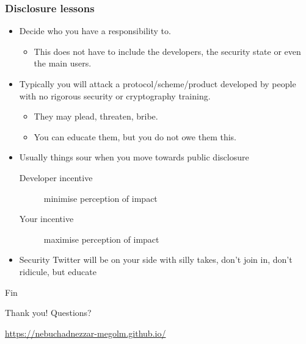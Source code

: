 \documentclass[aspectratio=169]{beamer}
\begin{document}
\begin{frame}
  \frametitle{Disclosure lessons}
  \begin{itemize}
  \item Decide who you have a responsibility to.
    \begin{itemize}
    \item This does not have to include the developers, the security state or even the main users.
    \end{itemize}
  \item Typically you will attack a protocol/scheme/product developed by people with no rigorous security or cryptography training.
    \begin{itemize}
    \item They may plead, threaten, bribe.
    \item You can educate them, but you do not owe them this.
    \end{itemize}
  \item Usually things sour when you move towards public disclosure
    \begin{description}
    \item[Developer incentive] minimise perception of impact
    \item[Your incentive] maximise perception of impact
    \end{description}
  \item Security Twitter will be on your side with silly takes, don't join in, don't ridicule, but educate
  \end{itemize}
\end{frame}

\begin{frame}[standout]{Fin}
  \begin{center}
    \Huge Thank you! Questions?
  \end{center}
  \url{https://nebuchadnezzar-megolm.github.io/}
\end{frame}
\end{document}
